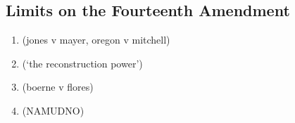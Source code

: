 \subsection{Limits on the Fourteenth Amendment}

\begin{enumerate}
    \item (jones v mayer, oregon v mitchell) %
    \item (`the reconstruction power') %
    \item (boerne v flores) %
    \item (NAMUDNO) %
\end{enumerate}
